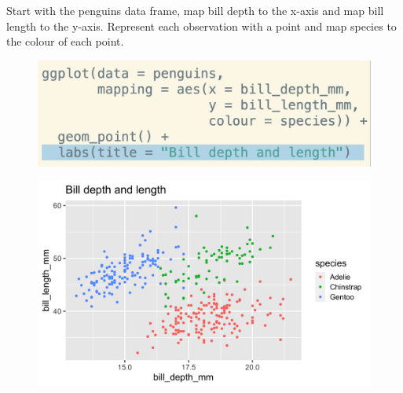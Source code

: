 \documentclass[11pt]{beamer}
\begin{document}
	\begin{frame}
	
	Start with the penguins data frame, map bill depth to the x-axis and map bill length to the y-axis. Represent each observation with a point and map species to the colour of each point. 
	
	\begin{minipage}[t]{0.5\linewidth}
		\begin{figure}
			\centering
			\includegraphics[width=1\linewidth]{Images/S2/code/s11}
			
		\end{figure}
	\end{minipage}%
	\begin{minipage}[t]{0.5\linewidth}
		
		\begin{figure}
			\centering
			\includegraphics[width=1\linewidth]{Images/S2/penguins-5-1}
			
		\end{figure}
		
		
	\end{minipage}
	
\end{frame}
\end{document}
